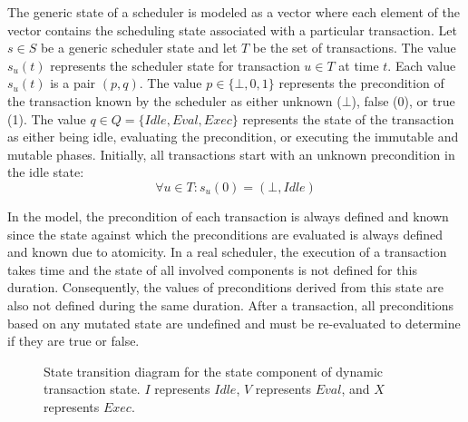 The generic state of a scheduler is modeled as a vector where each element of the vector contains the scheduling state associated with a particular transaction.
Let $s \in S$ be a generic scheduler state and let $T$ be the set of transactions.
The value $s_u(t)$ represents the scheduler state for transaction $u \in T$ at time $t$.
Each value $s_u(t)$ is a pair $(p, q)$.
The value $p \in \{\bot, 0, 1\}$ represents the precondition of the transaction known by the scheduler as either unknown ($\bot$), false (0), or true (1).
The value $q \in Q = \{\mathit{Idle}, \mathit{Eval}, \mathit{Exec}\}$ represents the state of the transaction as either being idle, evaluating the precondition, or executing the immutable and mutable phases.
Initially, all transactions start with an unknown precondition in the idle state:
\begin{equation}
  \forall u \in T : s_u(0) = (\bot, \mathit{Idle})
\end{equation}

In the model, the precondition of each transaction is always defined and known since the state against which the preconditions are evaluated is always defined and known due to atomicity.
In a real scheduler, the execution of a transaction takes time and the state of all involved components is not defined for this duration.
Consequently, the values of preconditions derived from this state are also not defined during the same duration.
After a transaction, all preconditions based on any mutated state are undefined and must be re-evaluated to determine if they are true or false.

\begin{figure}
\centering
\begingroup
\fontsize{10pt}{12pt}\selectfont
{}
\endgroup
\caption{State transition diagram for the state component of dynamic transaction state.
  $I$ represents $\mathit{Idle}$, $V$ represents $\mathit{Eval}$, and $X$ represents $\mathit{Exec}$.
  \label{dt_state}}
\end{figure}

